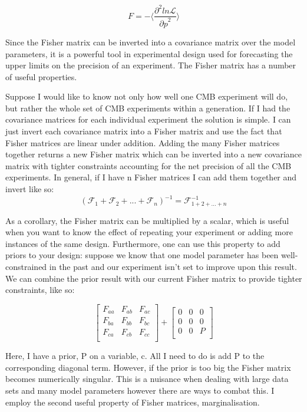 \begin{equation}
F = - \langle \frac{\partial^{2}ln{\mathcal{L}}}{{\partial p}^2} \rangle
\end{equation}

Since the Fisher matrix can be inverted into a covariance matrix over the model parameters, it is a powerful tool in experimental design used for forecasting the upper limits on the precision of an experiment. The Fisher matrix has a number of useful properties.

Suppose I would like to know not only how well one CMB experiment will do, but rather the whole set of CMB experiments within a generation. If I had the covariance matrices for each individual experiment the solution is simple. I can just invert each covariance matrix into a Fisher matrix and use the fact that Fisher matrices are linear under addition. Adding the many Fisher matrices together returns a new Fisher matrix which can be inverted into a new covariance matrix with tighter constraints accounting for the net precision of all the CMB experiments. In general, if I have n Fisher matrices I can add them together and invert like so:
\begin{equation}
(\mathcal{F}_{1} + \mathcal{F}_{2} + ... + \mathcal{F}_{n})^{-1} = \mathcal{F}^{-1}_{1+2+...+n}
\end{equation}

As a corollary, the Fisher matrix can be multiplied by a scalar, which is useful when you want to know the effect of repeating your experiment or adding more instances of the same design. Furthermore, one can use this property to add priors to your design: suppose we know that one model parameter has been well-constrained in the past and our experiment isn't set to improve upon this result. We can combine the prior result with our current Fisher matrix to provide tighter constraints, like so:

$$ \begin{bmatrix}
F_{aa} & F_{ab} & F_{ac}\\  
F_{ba} & F_{bb} & F_{bc}\\   
F_{ca} & F_{cb} & F_{cc}\\
\end{bmatrix}
+
\begin{bmatrix}
0 & 0 & 0  \\
0 & 0 & 0   \\
0 & 0 & P\\
\end{bmatrix} $$

Here, I have a prior, P on a variable, c. All I need to do is add P to the corresponding diagonal term. However, if the prior is too big the Fisher matrix becomes numerically singular. This is a nuisance when dealing with large data sets and many model parameters however there are ways to combat this. I employ the second useful property of Fisher matrices, marginalisation.

